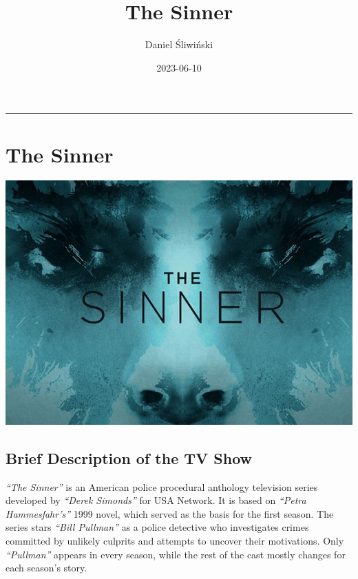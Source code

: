 \documentclass[
  letterpaper,
  DIV=11,
  numbers=noendperiod]{scrartcl}
\title{The Sinner}
\author{Daniel Śliwiński}
\date{2023-06-10}
\begin{document}
\maketitle
\ifdefined\Shaded\renewenvironment{Shaded}{\begin{tcolorbox}[enhanced, boxrule=0pt, interior hidden, frame hidden, sharp corners, breakable, borderline west={3pt}{0pt}{shadecolor}]}{\end{tcolorbox}}\fi

\begin{center}\rule{0.5\linewidth}{0.5pt}\end{center}

\hypertarget{the-sinner}{%
\section{The Sinner}\label{the-sinner}}

\includegraphics{sinner_files/sinner.jpg}

\subsection{Brief Description of the TV Show}

\emph{``The Sinner''} is an American police procedural anthology
television series developed by \emph{``Derek Simonds''} for USA Network.
It is based on \emph{``Petra Hammesfahr's''} 1999 novel, which served as
the basis for the first season. The series stars \emph{``Bill Pullman''}
as a police detective who investigates crimes committed by unlikely
culprits and attempts to uncover their motivations. Only
\emph{``Pullman''} appears in every season, while the rest of the cast
mostly changes for each season's story.
\end{document}

